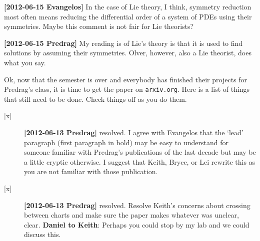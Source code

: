 \begin{description}
{\bf [2012-06-15 Evangelos]} In the case of Lie theory,
I think, symmetry reduction most often means reducing the differential
order of a system of PDEs using their symmetries. Maybe this comment is not
fair for Lie theorists?

{\bf [2012-06-15 Predrag]} My reading is of Lie's theory is that it is
used to find solutions by assuming their symmetries. Olver, however, also
a Lie theorist, does what you say.








\newpage
\item[2012-05-08 Daniel to Gang] Ok, now that the semester is over and
everybody has finished their projects for Predrag's class, it is time to
get the paper on \texttt{arxiv.org}. Here is a list of things that still
need to be done. Check things off as you do them.

\begin{description}

\item[{[x]}] {\bf [2012-06-13 Predrag]} resolved. I agree with Evangelos
that the `lead' paragraph (first paragraph in bold) may be easy to
understand for someone familiar with Predrag's publications of the last
decade but may be a little cryptic otherwise. I suggest that Keith,
Bryce, or Lei rewrite this as you are not familiar with those
publication.

\item[{[x]}] {\bf [2012-06-13 Predrag]} resolved. Resolve Keith's
concerns about crossing between charts and make sure the paper makes
whatever was unclear, clear. {\bf Daniel to Keith}: Perhaps you could
stop by my lab and we could discuss this.


\end{description}
\end{description}
